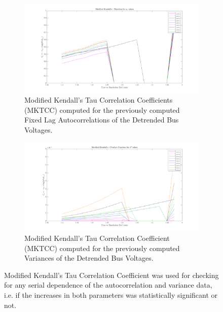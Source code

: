 \begin{figure}[!htpb]
	\begin{subfigure}{\textwidth}
		\centering
		\includegraphics[scale=0.25]{../figures/analysis_matlab/mktcc_ar1_run02}
		\caption{Modified Kendall's Tau Correlation Coefficients (MKTCC) computed for the previously computed Fixed Lag Autocorrelations of the Detrended Bus Voltages.}
	\end{subfigure}
	
	\begin{subfigure}{\textwidth}
		\centering
		\includegraphics[scale=0.25]{../figures/analysis_matlab/mktcc_var_run02}
		\caption{Modified Kendall's Tau Correlation Coefficient (MKTCC) computed for the previously computed Variances of the Detrended Bus Voltages.}
	\end{subfigure}
	
	\caption{Modified Kendall's Tau Correlation Coefficient was used for checking for any serial dependence of the autocorrelation and variance data, i.e. if the increases in both parameters was statistically significant or not.}
	\label{fig:mktccAutocorrAndVariance}
\end{figure}

